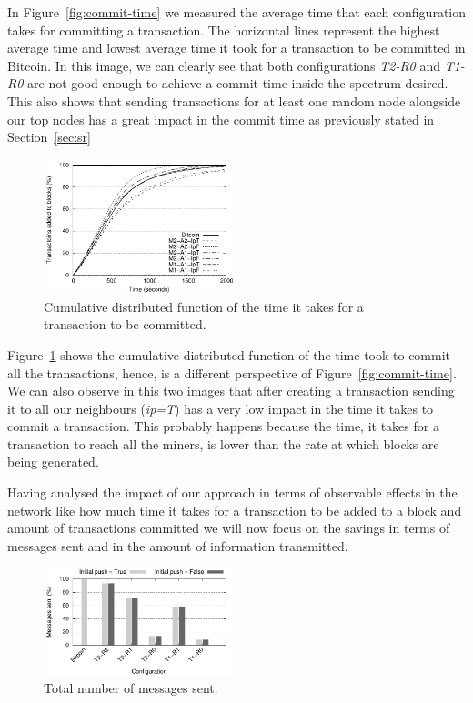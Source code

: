 \documentclass{dads}   %
\begin{document}
In Figure~\ref{fig:commit-time} we measured the average time that each configuration takes for committing a transaction. The horizontal lines represent the highest average time and lowest average time it took for a transaction to be committed in Bitcoin. In this image, we can clearly see that both configurations \textsl{T2-R0} and \textsl{T1-R0} are not good enough to achieve a commit time inside the spectrum desired. This also shows that sending transactions for at least one random node alongside our top nodes has a great impact in the commit time as previously stated in Section~\ref{sec:sr}

\begin{figure}
\centering
\includegraphics[width=0.5\textwidth]{plots/cdf_commit.pdf}
\caption{Cumulative distributed function of the time it takes for a transaction to be committed.}
\label{fig:cdf-commit}
\end{figure}

Figure~\ref{fig:cdf-commit} shows the cumulative distributed function of the time took to commit all the transactions, hence, is a different perspective of Figure~\ref{fig:commit-time}. We can also observe in this two images that after creating a transaction sending it to all our neighbours (\emph{ip=T}) has a very low impact in the time it takes to commit a transaction. This probably happens because the time, it takes for a transaction to reach all the miners, is lower than the rate at which blocks are being generated.

Having analysed the impact of our approach in terms of observable effects in the network like how much time it takes for a transaction to be added to a block and amount of transactions committed we will now focus on the savings in terms of messages sent and in the amount of information transmitted.
\begin{figure}[t]
\centering
\includegraphics[width=0.5\textwidth]{plots/msg-sent.pdf}
\caption{Total number of messages sent.}
\label{fig:msg-sent}
\end{figure}
\end{document}
